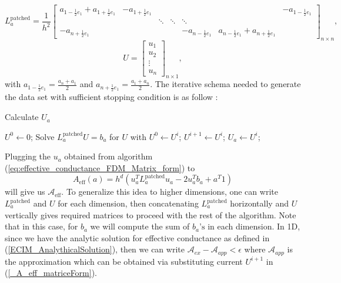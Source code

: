 \begin{equation*}
	L_{a}^{\text{patched}} = \frac{1}{h^2}\begin{bmatrix}
		a_{1 - \frac{1}{2}e_{1}} + a_{1 + \frac{1}{2}e_{1}}  &  -a_{1+\frac{1}{2}e_{1}} &  &  & & &-a_{1-\frac{1}{2}e_{1}}\\
		&& \ddots& \ddots &\ddots  &&  \\
		-a_{n+\frac{1}{2}e_{1}}&& & & -a_{n-\frac{1}{2}e_{1}} &a_{n-\frac{1}{2}e_{1}} + a_{n+\frac{1}{2}e_{1}}
	\end{bmatrix}_{n \times n},
\end{equation*}
\begin{equation*}
	U = \begin{bmatrix}
		u_{1} \\
		u_{2} \\
		\vdots \\
		u_{n}
	\end{bmatrix}_{n \times 1},
\end{equation*}
with $a_{1-\frac{1}{2}e_{1}} = \frac{a_{n} + a_{1}}{2}$ and $a_{n+\frac{1}{2}e_{1}} = \frac{a_{1} + a_{n}}{2}$.
The iterative schema needed to generate the data set with sufficient stopping condition is as follow : 
\begin{algorithm}[H]
	\caption{Calculate $U_a$}
	\label{eq:effective_conductance_FDM_Matrix_form}
	\begin{algorithmic} 
		\State $U^0 \leftarrow 0$;
		\State Solve $L_a^{\text{patched}} U = b_a$ for $U$ with $U^0 \leftarrow U^i$;
		\State $U^{i+1} \leftarrow U^{i}$;
		\EndWhile
		\State $U_a \leftarrow U^{i}$;
	\end{algorithmic}
\end{algorithm}
Plugging the $u_a$ obtained from algorithm (\ref{eq:effective_conductance_FDM_Matrix_form}) to
\begin{equation}
	\label{_A_eff_matriceForm}
	A_{\text{eff}}(a) = h^d (u_{a}^{T} L_{a}^{\text{patched}} u_{a} - 2u_{a}^{T}b_a + a^T 1) 
\end{equation}
will give us $\mathscr{A}_{\text{eff}}$. To generalize this idea to higher dimensions, one can write $L_a^{\text{patched}}$ and $U$ for each dimension, then concatenating $L_a^{\text{patched}}$ horizontally and $U$ vertically gives required matrices to proceed with the rest of the algorithm. Note that in this case, for $b_a$ we will compute the sum of $b_a\text{'s}$ in each dimension. In 1D, since we have the analytic solution for effective conductance as defined in (\ref{ECIM_AnalythicalSolution}), then we can write $\mathscr{A}_{ex} - \mathscr{A}_{app} < \epsilon$ where $\mathscr{A}_{app}$ is the approximation which can be obtained via substituting current $U^{i+1}$ in (\ref{_A_eff_matriceForm}). 
